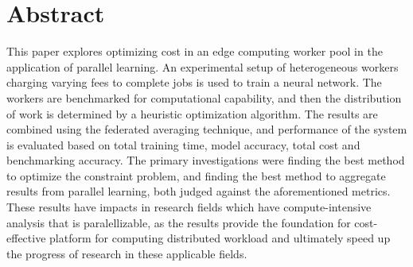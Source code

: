 \documentclass[../mthe-493-final-project.tex]{subfiles}
\begin{document}
    \chapter{Abstract}
    \label{ch:abstract}
    
    This paper explores optimizing cost in an edge computing worker pool in the application of parallel learning. An experimental setup of  heterogeneous workers charging varying fees to complete jobs is used to train a neural network. The workers are benchmarked for computational capability, and then the distribution of work is determined by a heuristic optimization algorithm. The results are combined using the federated averaging technique, and performance of the system is evaluated based on total training time, model accuracy, total cost and benchmarking accuracy. The primary investigations were finding the best method to optimize the constraint problem, and finding the best method to aggregate results from parallel learning, both judged against the aforementioned metrics. These results have impacts in research fields which have compute-intensive analysis that is paralellizable, as the results provide the foundation for cost-effective platform for computing distributed workload and ultimately speed up the progress of research in these applicable fields. 
    
\end{document}
